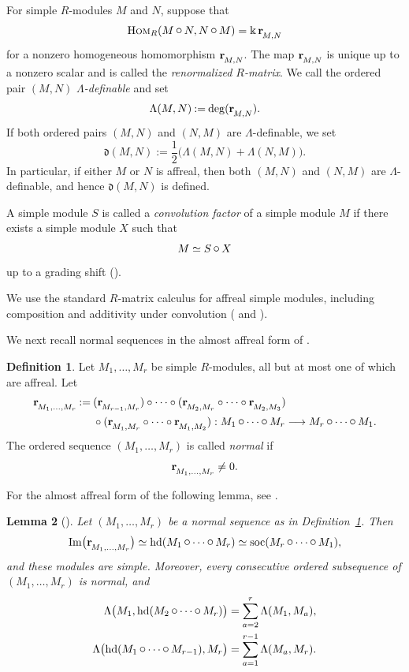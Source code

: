 \documentclass[12pt, leqno]{amsart}
\numberwithin{equation}{section}
\theoremstyle{plain}
\newtheorem{lemma}{Lemma}[section]
\theoremstyle{definition}
\newtheorem{definition}[lemma]{Definition}
\newcommand{\rmat}[1]{{\mathbf r}_{\mspace{-2mu}\raisebox{-.5ex}{${\scriptstyle{#1}}$}}}
\newcommand{\head}{{\operatorname{hd}}}
\newcommand{\soc}{{\operatorname{soc}}}
\newcommand{\seteq}{\mathbin{:=}}
\newcommand{\conv}{\mathop{\mathbin{\mbox{\large $\circ$}}}}
\newcommand{\de}{\mathfrak{d}}
\newcommand{\HOM}{\mathrm{H{\scriptstyle OM}}}
\begin{document}
For simple \(R\)-modules \(M\) and \(N\), suppose that
\[
\HOM_R(M\conv N,N\conv M)=\Bbbk\,\rmat{M,N}
\]
for a nonzero homogeneous homomorphism \(\rmat{M,N}\).  The map \(\rmat{M,N}\) is unique up to a nonzero scalar and is
called the \emph{renormalized \(R\)-matrix}.
We call the ordered pair \((M,N)\) \emph{\(\Lambda\)-definable}
and set
\[
\Lambda(M,N)\seteq\deg(\rmat{M,N}).
\]
If both ordered pairs $(M,N)$ and $(N,M)$ are
\(\Lambda\)-definable, we set
\[
\de(M,N)
\seteq
\frac12\bigl(\Lambda(M,N)+\Lambda(N,M)\bigr).
\]
In particular, if either \(M\) or \(N\) is affreal, then both
\((M,N)\) and \((N,M)\) are \(\Lambda\)-definable, and hence
\(\de(M,N)\) is defined.

A simple module \(S\) is called a \emph{convolution factor} of a
simple module \(M\) if there exists a simple module \(X\) such that
\[
M\simeq S\conv X
\]
up to a grading shift (\cite[Section~2.3]{KKOP26}).
 
We use the standard \(R\)-matrix calculus for affreal simple
modules, including composition and additivity under convolution
(\cite[Lemma~3.16]{KKOP21} and
\cite[Proposition~2.6]{KKOP26}). 
 

We next recall normal sequences in the almost affreal form of
\cite[Section~2.3]{KKOP26}. 

\begin{definition}\label{def: normal sequence} \cite[Definition 2.5]{KK19}
Let \(M_1,\ldots,M_r\) be simple \(R\)-modules, all but at most one of
which are affreal. Let
\[
\begin{split}
\rmat{M_1,\ldots,M_r}
\seteq{}&
(\rmat{M_{r-1},M_r})\circ\cdots\circ
(\rmat{M_2,M_r}\circ\cdots\circ\rmat{M_2,M_3})\\
&\circ
(\rmat{M_1,M_r}\circ\cdots\circ\rmat{M_1,M_2}):
M_1\conv\cdots\conv M_r
\longrightarrow
M_r\conv\cdots\conv M_1.
\end{split}
\]
The ordered sequence
\( (M_1,\ldots,M_r) \) is called \emph{normal} if
\[
\rmat{M_1,\ldots,M_r}\ne0.
\]
\end{definition}

 

For the almost affreal form of the following lemma, see
\cite[Lemma~2.8 and Section~2.2]{KKOP23L}. 

\begin{lemma}[{\cite[Lemmas~2.6--2.8]{KK19}}]
\label{lem: basic properties of normal sequences}
Let \( (M_1,\ldots,M_r) \) be a normal sequence as in
Definition~\ref{def: normal sequence}.  Then
\[
{\rm Im}\bigl(\rmat{M_1,\ldots,M_r}\bigr) \simeq \head(M_1\conv\cdots\conv M_r) \simeq \soc(M_r\conv\cdots\conv M_1),
\]
and these modules are simple.  Moreover, every consecutive ordered 
subsequence of \( (M_1,\ldots,M_r) \) is normal, and
\begin{align*}
\Lambda\bigl( M_1,\head(M_2\conv\cdots\conv M_r) \bigr) &= \sum_{a=2}^r\Lambda(M_1,M_a),  \\
\Lambda\bigl(\head(M_1\conv\cdots\conv M_{r-1}),M_r \bigr) &= \sum_{a=1}^{r-1}\Lambda(M_a,M_r).
\end{align*}
\end{lemma}
\end{document}
